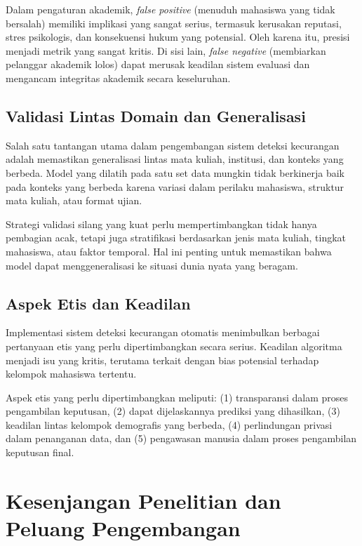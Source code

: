 Dalam pengaturan akademik, \textit{false positive} (menuduh mahasiswa yang tidak bersalah) memiliki implikasi yang sangat serius, termasuk kerusakan reputasi, stres psikologis, dan konsekuensi hukum yang potensial. Oleh karena itu, presisi menjadi metrik yang sangat kritis. Di sisi lain, \textit{false negative} (membiarkan pelanggar akademik lolos) dapat merusak keadilan sistem evaluasi dan mengancam integritas akademik secara keseluruhan.

\subsection{Validasi Lintas Domain dan Generalisasi}

Salah satu tantangan utama dalam pengembangan sistem deteksi kecurangan adalah memastikan generalisasi lintas mata kuliah, institusi, dan konteks yang berbeda. Model yang dilatih pada satu set data mungkin tidak berkinerja baik pada konteks yang berbeda karena variasi dalam perilaku mahasiswa, struktur mata kuliah, atau format ujian.

Strategi validasi silang yang kuat perlu mempertimbangkan tidak hanya pembagian acak, tetapi juga stratifikasi berdasarkan jenis mata kuliah, tingkat mahasiswa, atau faktor temporal. Hal ini penting untuk memastikan bahwa model dapat menggeneralisasi ke situasi dunia nyata yang beragam.

\subsection{Aspek Etis dan Keadilan}

Implementasi sistem deteksi kecurangan otomatis menimbulkan berbagai pertanyaan etis yang perlu dipertimbangkan secara serius. Keadilan algoritma menjadi isu yang kritis, terutama terkait dengan bias potensial terhadap kelompok mahasiswa tertentu.

Aspek etis yang perlu dipertimbangkan meliputi: (1) transparansi dalam proses pengambilan keputusan, (2) dapat dijelaskannya prediksi yang dihasilkan, (3) keadilan lintas kelompok demografis yang berbeda, (4) perlindungan privasi dalam penanganan data, dan (5) pengawasan manusia dalam proses pengambilan keputusan final.

\section{Kesenjangan Penelitian dan Peluang Pengembangan}
\label{sec:researchGaps}


